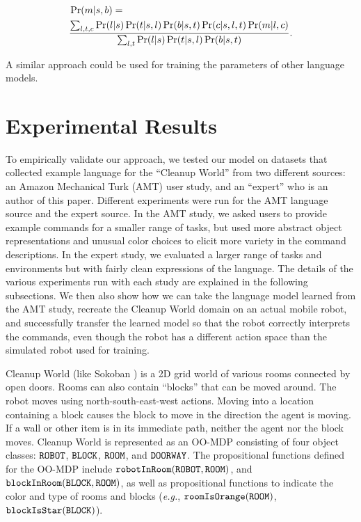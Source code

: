 \documentclass[conference]{IEEEtran}
\begin{document}
{
\footnotesize
\begin{equation}
\vspace{-1em}
\begin{split}
& \Pr(m | s, b) = \\ & \frac{\sum_{l,t,c} \Pr(l | s) \Pr(t | s, l) \Pr(b | s, t) \Pr(c | s, l, t) \Pr(m | l, c)}{\sum_{l,t} \Pr(l | s) \Pr(t | s, l) \Pr(b | s, t)}.
\end{split}
\end{equation}
}

\noindent A similar approach could be used for training the parameters of other language models.

\section{Experimental Results}
To empirically validate our approach, we tested our model on datasets that collected example language for the ``Cleanup World'' from two different sources: an Amazon Mechanical Turk (AMT) user study, and an ``expert'' who is an author of this paper. Different experiments were run for the AMT language source and the expert source. In the AMT study, we asked users to provide example commands for a smaller range of tasks, but used more abstract object representations and unusual color choices to elicit more variety in the command descriptions. In the expert study, we evaluated a larger range of tasks and environments but with fairly clean expressions of the language. The details of the various experiments run with each study are explained in the following subsections. We then also show how we can take the language model learned from the AMT study, recreate the Cleanup World domain on an actual mobile robot, and successfully transfer the learned model so that the robot correctly interprets the commands, even though the robot has a different action space than the simulated robot used for training.

Cleanup World (like Sokoban \cite{junghanns1997sokoban}) is a 2D grid world of various rooms connected by open doors. Rooms can also contain ``blocks'' that can be moved around. The robot moves using north-south-east-west actions. Moving into a location containing a block causes the block to move in the direction the agent is moving. If a wall or other item is in its immediate path, neither the agent nor the block moves. Cleanup World is represented as an OO-MDP consisting of four object classes: ${\tt ROBOT}$, ${\tt BLOCK}$, ${\tt ROOM}$, and ${\tt DOORWAY}$. %
The propositional functions defined for the OO-MDP include ${\tt robotInRoom}({\tt ROBOT}, {\tt ROOM})$, and ${\tt blockInRoom}({\tt BLOCK}, {\tt ROOM})$, as well as propositional functions to indicate the color and type of rooms and blocks (\emph{e.g.}, ${\tt roomIsOrange}({\tt ROOM})$, ${\tt blockIsStar}({\tt BLOCK})$).
\end{document}
